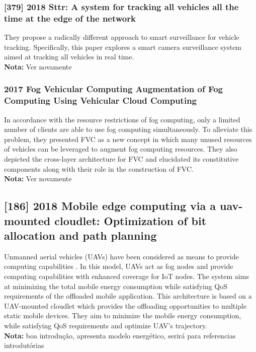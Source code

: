 \subsubsection{[379] 2018 Sttr: A system for tracking all vehicles all the time at the edge of the network}
They propose a radically different approach to smart surveillance for vehicle tracking. Specifically, this paper explores a smart camera surveillance system aimed at tracking all vehicles in real time.\\
\textbf{Nota:} Ver novamente

\subsubsection{2017 Fog Vehicular Computing Augmentation of Fog Computing Using Vehicular Cloud Computing}
In accordance with the resource restrictions of fog computing, only a limited number of clients are able to use fog computing simultaneously. To alleviate this problem, they presented FVC as a new concept in which many unused resources of vehicles can be leveraged to augment fog computing resources. They also depicted the cross-layer architecture for FVC and elucidated its constitutive components along with their role in the construction of FVC.\\
\textbf{Nota:} Ver novamente

\subsection{[186] 2018 Mobile edge computing via a uav-mounted cloudlet: Optimization of bit allocation and path planning}
\label{subsec:paper06}
Unmanned aerial vehicles (UAVs) have been considered as means to provide computing capabilities \cite{jeong2018mobile}. In this model, UAVs act as fog nodes and provide computing capabilities with enhanced coverage for IoT nodes. The system aims at minimizing the total mobile energy consumption while satisfying QoS requirements of the offloaded mobile application. This architecture is based on a UAV-mounted cloudlet which provides the offloading opportunities to multiple static mobile devices. They aim to minimize the mobile energy consumption, while satisfying QoS requirements and optimize UAV’s trajectory.\\
\textbf{Nota:} boa introdução, apresenta modelo energético, serirá para referencias introdutórias

